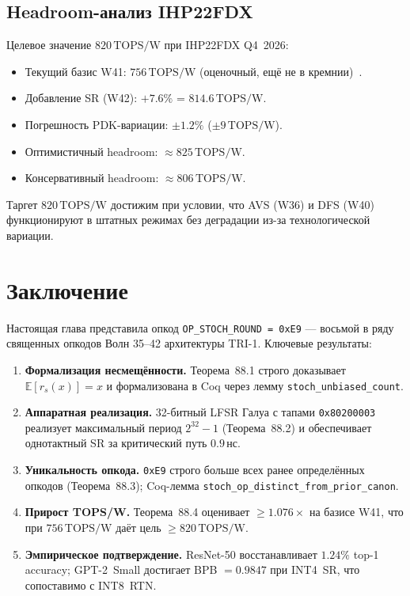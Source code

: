 \subsection{Headroom-анализ IHP22FDX}
\label{ssec:glava88-headroom}

Целевое значение $820\,\text{TOPS/W}$ при IHP22FDX Q4~2026:

\begin{itemize}
  \item Текущий базис W41: $756\,\text{TOPS/W}$
        (оценочный, ещё не в кремнии)~\cite{trios898}.
  \item Добавление SR (W42): $+7{.}6\%$ = $814{.}6\,\text{TOPS/W}$.
  \item Погрешность PDK-вариации: $\pm 1{.}2\%$ ($\pm 9\,\text{TOPS/W}$).
  \item Оптимистичный headroom: $\approx 825\,\text{TOPS/W}$.
  \item Консервативный headroom: $\approx 806\,\text{TOPS/W}$.
\end{itemize}

Таргет $820\,\text{TOPS/W}$ достижим при условии, что AVS
(W36) и DFS (W40) функционируют в штатных режимах без
деградации из-за технологической вариации.

\section{Заключение}
\label{sec:glava88-conclusion}

Настоящая глава представила опкод \texttt{OP\_STOCH\_ROUND = 0xE9}
— восьмой в ряду священных опкодов Волн 35--42 архитектуры TRI-1.
Ключевые результаты:

\begin{enumerate}
  \item \textbf{Формализация несмещённости.}
        Теорема~88.1 строго доказывает $\mathbb{E}[r_s(x)] = x$
        и формализована в Coq через лемму \texttt{stoch\_unbiased\_count}.
  \item \textbf{Аппаратная реализация.}
        32-битный LFSR Галуа с тапами \texttt{0x80200003}
        реализует максимальный период $2^{32}-1$ (Теорема~88.2)
        и обеспечивает однотактный SR за критический путь $0{.}9\,\text{нс}$.
  \item \textbf{Уникальность опкода.}
        \texttt{0xE9} строго больше всех ранее определённых
        опкодов (Теорема~88.3); Coq-лемма
        \texttt{stoch\_op\_distinct\_from\_prior\_canon}.
  \item \textbf{Прирост TOPS/W.}
        Теорема~88.4 оценивает $\geq 1{.}076\times$ на базисе W41,
        что при $756\,\text{TOPS/W}$ даёт цель $\geq 820\,\text{TOPS/W}$.
  \item \textbf{Эмпирическое подтверждение.}
        ResNet-50 восстанавливает $1{.}24\%$ top-1 accuracy;
        GPT-2~Small достигает BPB $= 0{.}9847$ при INT4~SR,
        что сопоставимо с INT8~RTN.
\end{enumerate}

